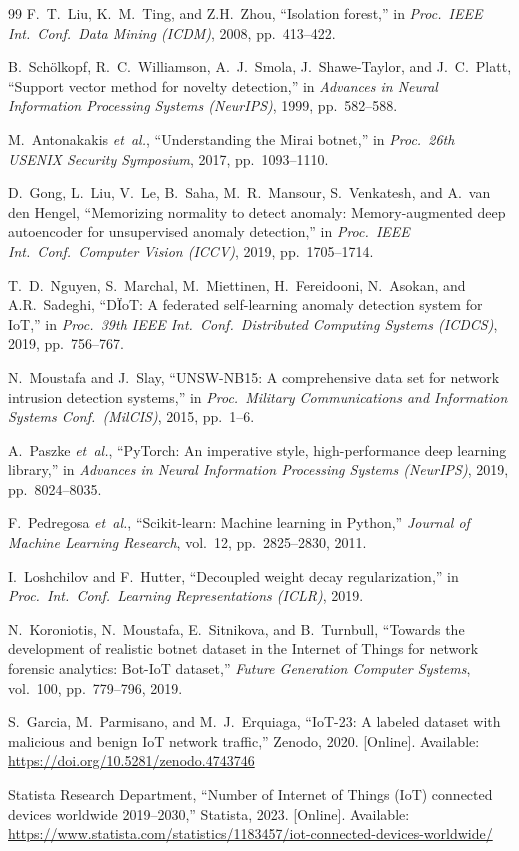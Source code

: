 \documentclass[journal,10pt,twoside]{IEEEtran}
\begin{document}
\begin{thebibliography}{99}
F.\ T.\ Liu, K.\ M.\ Ting, and Z.\-H.\ Zhou,
``Isolation forest,''
in \emph{Proc.\ IEEE Int.\ Conf.\ Data Mining (ICDM)}, 2008, pp.\ 413--422.

B.\ Sch\"{o}lkopf, R.\ C.\ Williamson, A.\ J.\ Smola, J.\ Shawe-Taylor,
and J.\ C.\ Platt,
``Support vector method for novelty detection,''
in \emph{Advances in Neural Information Processing Systems (NeurIPS)}, 1999,
pp.\ 582--588.

M.\ Antonakakis \emph{et~al.},
``Understanding the Mirai botnet,''
in \emph{Proc.\ 26th USENIX Security Symposium}, 2017, pp.\ 1093--1110.

D.\ Gong, L.\ Liu, V.\ Le, B.\ Saha, M.\ R.\ Mansour, S.\ Venkatesh,
and A.\ van den Hengel,
``Memorizing normality to detect anomaly: Memory-augmented deep autoencoder
for unsupervised anomaly detection,''
in \emph{Proc.\ IEEE Int.\ Conf.\ Computer Vision (ICCV)}, 2019,
pp.\ 1705--1714.

T.\ D.\ Nguyen, S.\ Marchal, M.\ Miettinen, H.\ Fereidooni, N.\ Asokan,
and A.\-R.\ Sadeghi,
``D\"{I}oT: A federated self-learning anomaly detection system for IoT,''
in \emph{Proc.\ 39th IEEE Int.\ Conf.\ Distributed Computing Systems (ICDCS)},
2019, pp.\ 756--767.

N.\ Moustafa and J.\ Slay,
``UNSW-NB15: A comprehensive data set for network intrusion detection
systems,''
in \emph{Proc.\ Military Communications and Information Systems Conf.\
(MilCIS)}, 2015, pp.\ 1--6.

A.\ Paszke \emph{et~al.},
``PyTorch: An imperative style, high-performance deep learning library,''
in \emph{Advances in Neural Information Processing Systems (NeurIPS)}, 2019,
pp.\ 8024--8035.

F.\ Pedregosa \emph{et~al.},
``Scikit-learn: Machine learning in Python,''
\emph{Journal of Machine Learning Research}, vol.\ 12, pp.\ 2825--2830, 2011.

I.\ Loshchilov and F.\ Hutter,
``Decoupled weight decay regularization,''
in \emph{Proc.\ Int.\ Conf.\ Learning Representations (ICLR)}, 2019.

N.\ Koroniotis, N.\ Moustafa, E.\ Sitnikova, and B.\ Turnbull,
``Towards the development of realistic botnet dataset in the Internet of
Things for network forensic analytics: Bot-IoT dataset,''
\emph{Future Generation Computer Systems}, vol.\ 100, pp.\ 779--796, 2019.

S.\ Garcia, M.\ Parmisano, and M.\ J.\ Erquiaga,
``IoT-23: A labeled dataset with malicious and benign IoT network traffic,''
Zenodo, 2020. [Online]. Available: \url{https://doi.org/10.5281/zenodo.4743746}

Statista Research Department,
``Number of Internet of Things (IoT) connected devices worldwide 2019--2030,''
Statista, 2023. [Online].
Available: \url{https://www.statista.com/statistics/1183457/iot-connected-devices-worldwide/}

\end{thebibliography}
\end{document}
